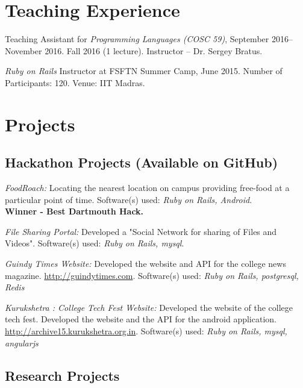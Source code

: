 \documentclass[letterpaper,10pt]{article}
\renewenvironment{itemize}{
  \begin{list}{}{
    \setlength{\leftmargin}{1.5em}
  }
}{
  \end{list}
}
\begin{document}
\section*{Teaching Experience}
\begin{itemize}
\setlength\itemsep{0ex}
\item Teaching Assistant for \textit{Programming Languages (COSC 59)}, September 2016-- November 2016.
		\subitem Fall 2016 (1 lecture). Instructor -- Dr. Sergey Bratus.
\item \textit{Ruby on Rails} Instructor at FSFTN Summer Camp, June 2015.
    \subitem Number of Participants: 120.
    \subitem Venue: IIT Madras.
\end{itemize}



\section*{Projects}
\subsection*{Hackathon Projects (Available on GitHub)}
\begin{itemize}
\setlength\itemsep{0ex}
  \item \textit{FoodRoach:} Locating the nearest location on campus providing free-food at a particular point of time. Software(s) used: \textsl{Ruby on Rails, Android}. \\ {\bf Winner - Best Dartmouth Hack.}
\item \textit{File Sharing Portal:} Developed a "Social Network for sharing of Files and Videos". Software(s) used: \textsl{Ruby on Rails, mysql}.
\item \textit{Guindy Times Website:} Developed the website and API for the college news magazine. \url{http://guindytimes.com}. Software(s) used: \textsl{Ruby on Rails, postgresql, Redis}
\item \textit{Kurukshetra : College Tech Fest Website:} Developed the website of the college tech fest. Developed the website and the API for the android application. \url{http://archive15.kurukshetra.org.in}. Software(s) used: \textsl{Ruby on Rails, mysql, angularjs}
\end{itemize}


\subsection*{Research Projects}
\end{document}
